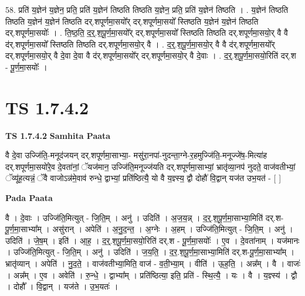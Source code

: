\documentclass[17pt]{extarticle}
\begin{document}
58. प्रति॑ य॒ज्ञेन॑ य॒ज्ञेन॒ प्रति॒ प्रति॑ य॒ज्ञेन॑ तिष्ठति तिष्ठति य॒ज्ञेन॒ प्रति॒ प्रति॑ य॒ज्ञेन॑ तिष्ठति । . य॒ज्ञेन॑ तिष्ठति तिष्ठति य॒ज्ञेन॑ य॒ज्ञेन॑ तिष्ठति दर्.शपूर्णमा॒सयो᳚र् दर्.शपूर्णमा॒सयो᳚ स्तिष्ठति य॒ज्ञेन॑ य॒ज्ञेन॑ तिष्ठति दर्.शपूर्णमा॒सयोः᳚ । . ति॒ष्ठ॒ति॒ द॒र्॒.श॒पू॒र्ण॒मा॒सयो᳚र् दर्.शपूर्णमा॒सयो᳚ स्तिष्ठति तिष्ठति दर्.शपूर्णमा॒सयो॒र् 
वै वै द॑र्.शपूर्णमा॒सयो᳚ स्तिष्ठति तिष्ठति दर्.शपूर्णमा॒सयो॒र् वै । . द॒र्॒.श॒पू॒र्ण॒मा॒सयो॒र् वै वै द॑र्.शपूर्णमा॒सयो᳚र् दर्.शपूर्णमा॒सयो॒र् वै दे॒वा दे॒वा वै 
द॑र्.शपूर्णमा॒सयो᳚र् दर्.शपूर्णमा॒सयो॒र् वै दे॒वाः । . द॒र्॒.श॒पू॒र्ण॒मा॒सयो॒रिति॑ दर्.श - पू॒र्ण॒मा॒सयोः᳚ । \newline
\pagebreak
{}

\section{ TS 1.7.4.2 }

\textbf{TS 1.7.4.2 } \newline
\textbf{Samhita Paata} \newline

वै दे॒वा उज्जि॑ति॒-मनूद॑जयन् दर्.शपूर्णमा॒साभ्या॒- मसु॑रा॒नपा॑-नुदन्ता॒ग्ने-र॒हमुज्जि॑ति॒-मनूज्जे॑ष॒-मित्या॑ह दर्.शपूर्णमा॒सयो॑रे॒व दे॒वता॑नां॒ ॅयज॑मान॒ उज्जि॑ति॒मनूज्ज॑यति दर्.शपूर्णमा॒साभ्यां॒ भ्रातृ॑व्या॒नप॑ नुदते॒ वाज॑वतीभ्यां॒ ॅव्यू॑ह॒त्यन्नं॒ ॅवै वाजोऽन्न॑मे॒वाव॑ रुन्धे॒ द्वाभ्यां॒ प्रति॑ष्ठित्यै॒ यो वै य॒ज्ञ्स्य॒ द्वौ दोहौ॑ वि॒द्वान् यज॑त उभ॒यत॑ - [ ] \newline

\textbf{Pada Paata} \newline

वै । दे॒वाः । उज्जि॑ति॒मित्युत् - जि॒ति॒म् । अनु॑ । उदिति॑ । अ॒ज॒य॒न्न् । द॒र्॒.श॒पू॒र्ण॒मा॒साभ्या॒मिति॑ दर्.श-पू॒र्ण॒मा॒साभ्या᳚म् । असु॑रान् । अपेति॑ । अ॒नु॒द॒न्त॒ । अ॒ग्नेः । अ॒हम् । उज्जि॑ति॒मित्युत् - जि॒ति॒म् । अनु॑ । उदिति॑ । जे॒ष॒म् । इति॑ । आ॒ह॒ । द॒र्॒.श॒पू॒र्ण॒मा॒सयो॒रिति॑ दर्.श - पू॒र्ण॒मा॒सयोः᳚ । ए॒व । दे॒वता॑नाम् । यज॑मानः । उज्जि॑ति॒मित्युत् - जि॒ति॒म् । अनु॑ । उदिति॑ । ज॒य॒ति॒ । द॒र॒.श॒पू॒र्ण॒मा॒साभ्या॒मिति॑ दर्.श-पू॒र्ण॒मा॒साभ्या᳚म् । भ्रातृ॑व्यान् । अपेति॑ । नु॒द॒ते॒ । वाज॑वतीभ्या॒मिति॒ वाज॑ - व॒ती॒भ्या॒म् । वीति॑ । ऊ॒ह॒ति॒ । अन्न᳚म् । वै । वाजः॑ । अन्न᳚म् । ए॒व । अवेति॑ । रु॒न्धे॒ । द्वाभ्या᳚म् । प्रति॑ष्ठित्या॒ इति॒ प्रति॑ - स्थि॒त्यै॒ । यः । वै । य॒ज्ञ्स्य॑ । द्वौ । दोहौ᳚ । वि॒द्वान् । यज॑ते । उ॒भ॒यतः॑ ।  \newline
\end{document}
